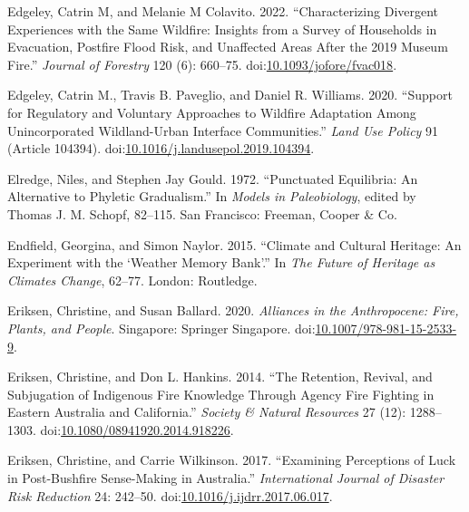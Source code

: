 \documentclass[
]{article}
\newlength{\cslhangindent}
\newenvironment{CSLReferences}[2] %
 {\begin{list}{}{%
  \setlength{\itemindent}{0pt}
  \setlength{\leftmargin}{0pt}
  \setlength{\parsep}{0pt}
  \ifodd #1
   \setlength{\leftmargin}{\cslhangindent}
   \setlength{\itemindent}{-1\cslhangindent}
  \fi
  \setlength{\itemsep}{#2\baselineskip}}}
 {\end{list}}
\begin{document}
\begin{CSLReferences}{1}{0}
Edgeley, Catrin M, and Melanie M Colavito. 2022. {``Characterizing {Divergent Experiences} with the {Same Wildfire}: {Insights} from a {Survey} of {Households} in {Evacuation}, {Postfire Flood Risk}, and {Unaffected Areas After} the 2019 {Museum Fire}.''} \emph{Journal of Forestry} 120 (6): 660--75. doi:\href{https://doi.org/10.1093/jofore/fvac018}{10.1093/jofore/fvac018}.

Edgeley, Catrin M., Travis B. Paveglio, and Daniel R. Williams. 2020. {``Support for Regulatory and Voluntary Approaches to Wildfire Adaptation Among Unincorporated Wildland-Urban Interface Communities.''} \emph{Land Use Policy} 91 (Article 104394). doi:\href{https://doi.org/10.1016/j.landusepol.2019.104394}{10.1016/j.landusepol.2019.104394}.

Elredge, Niles, and Stephen Jay Gould. 1972. {``Punctuated Equilibria: {An} Alternative to Phyletic Gradualism.''} In \emph{Models in Paleobiology}, edited by Thomas J. M. Schopf, 82--115. San Francisco: Freeman, Cooper \& Co.

Endfield, Georgina, and Simon Naylor. 2015. {``Climate and Cultural Heritage: An Experiment with the {`{Weather Memory Bank}'}.''} In \emph{The {Future} of {Heritage} as {Climates Change}}, 62--77. London: Routledge.

Eriksen, Christine, and Susan Ballard. 2020. \emph{Alliances in the {Anthropocene}: {Fire}, {Plants}, and {People}}. Singapore: Springer Singapore. doi:\href{https://doi.org/10.1007/978-981-15-2533-9}{10.1007/978-981-15-2533-9}.

Eriksen, Christine, and Don L. Hankins. 2014. {``The {Retention}, {Revival}, and {Subjugation} of {Indigenous Fire Knowledge} Through {Agency Fire Fighting} in {Eastern Australia} and {California}.''} \emph{Society \& Natural Resources} 27 (12): 1288--1303. doi:\href{https://doi.org/10.1080/08941920.2014.918226}{10.1080/08941920.2014.918226}.

Eriksen, Christine, and Carrie Wilkinson. 2017. {``Examining Perceptions of Luck in Post-Bushfire Sense-Making in {Australia}.''} \emph{International Journal of Disaster Risk Reduction} 24: 242--50. doi:\href{https://doi.org/10.1016/j.ijdrr.2017.06.017}{10.1016/j.ijdrr.2017.06.017}.


\end{CSLReferences}
\end{document}

